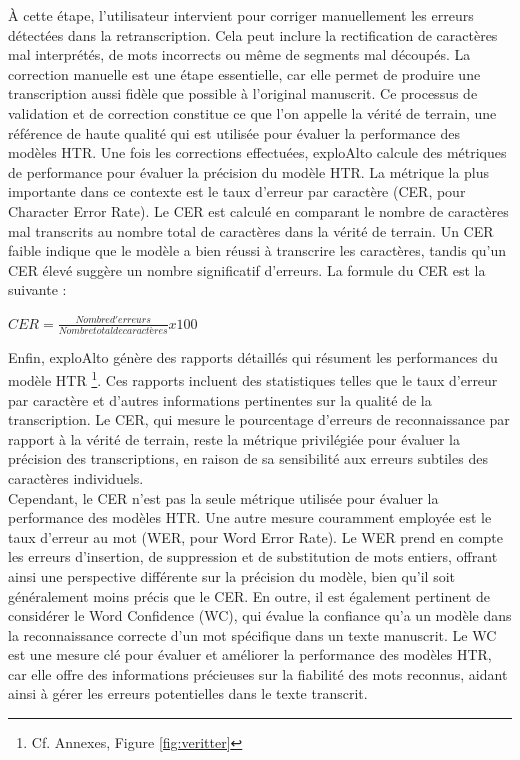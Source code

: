 \documentclass[a4paper,12pt,twoside]{book}
\begin{document}
	À cette étape, l’utilisateur intervient pour corriger manuellement les erreurs détectées dans la retranscription. Cela peut inclure la rectification de caractères mal interprétés, de mots incorrects ou même de segments mal découpés. La correction manuelle est une étape essentielle, car elle permet de produire une transcription aussi fidèle que possible à l’original manuscrit. Ce processus de validation et de correction constitue ce que l’on appelle la vérité de terrain, une référence de haute qualité qui est utilisée pour évaluer la performance des modèles HTR. 
	Une fois les corrections effectuées, exploAlto calcule des métriques de performance pour évaluer la précision du modèle HTR. La métrique la plus importante dans ce contexte est le taux d’erreur par caractère (CER, pour Character Error Rate). Le CER est calculé en comparant le nombre de caractères mal transcrits au nombre total de caractères dans la vérité de terrain. Un CER faible indique que le modèle a bien réussi à transcrire les caractères, tandis qu’un CER élevé suggère un nombre significatif d’erreurs. La formule du CER est la suivante :
	
	\begin{center}
			$ CER = \frac{Nombre d'erreurs}{Nombre total de caractères} x 100 $
	\end{center}

	Enfin, exploAlto génère des rapports détaillés qui résument les performances du modèle HTR \footnote{Cf. Annexes, Figure \ref{fig:veritter}}. Ces rapports incluent des statistiques telles que le taux d’erreur par caractère et d’autres informations pertinentes sur la qualité de la transcription. Le CER, qui mesure le pourcentage d’erreurs de reconnaissance par rapport à la vérité de terrain, reste la métrique privilégiée pour évaluer la précision des transcriptions, en raison de sa sensibilité aux erreurs subtiles des caractères individuels.
	\\
	
	Cependant, le CER n’est pas la seule métrique utilisée pour évaluer la performance des modèles HTR. Une autre mesure couramment employée est le taux d’erreur au mot (WER, pour Word Error Rate). Le WER prend en compte les erreurs d’insertion, de suppression et de substitution de mots entiers, offrant ainsi une perspective différente sur la précision du modèle, bien qu’il soit généralement moins précis que le CER. En outre, il est également pertinent de considérer le Word Confidence (WC), qui évalue la confiance qu’a un modèle dans la reconnaissance correcte d’un mot spécifique dans un texte manuscrit. Le WC est une mesure clé pour évaluer et améliorer la performance des modèles HTR, car elle offre des informations précieuses sur la fiabilité des mots reconnus, aidant ainsi à gérer les erreurs potentielles dans le texte transcrit.
	
\end{document}
